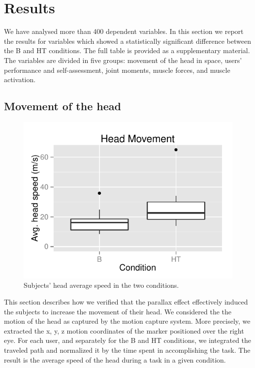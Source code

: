 \section{Results}

We have analysed more than 400 dependent variables. In this section we report the results for variables which showed a statistically significant difference between the B and HT conditions. The full table is provided as a supplementary material. 
The variables are divided in five groups: movement of the head in space, users' performance and self-assessment, joint moments, muscle forces, and muscle activation.

\subsection{Movement of the head}


\begin{figure}[tb]
\centering%
\includegraphics[width=\columnwidth]{img/HeadMovement-ggplot}%
\caption{Subjects' head average speed in the two conditions.}%
\label{fig:head-movement}
\end{figure}

This section describes how we verified that the parallax effect effectively induced the subjects to increase the movement of their head. We considered the the motion of the head as captured by the motion capture system. More precisely, we extracted the x, y, z motion coordinates of the marker positioned over the right eye. For each user, and separately for the B and HT conditions, we integrated the traveled path and normalized it by the time spent in accomplishing the task. The result is the average speed of the head during a task in a given condition.

